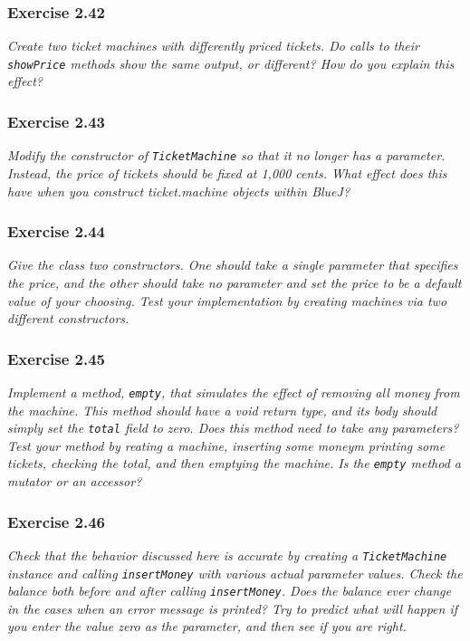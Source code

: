 \subsubsection*{Exercise 2.42}
\textit{Create two ticket machines with differently priced tickets. Do calls 
to their \lstinline?showPrice? methods show the same output, or different? How 
do you explain this effect? }

\subsubsection*{Exercise 2.43}
\textit{Modify the constructor of \lstinline?TicketMachine? so that it no 
longer has a parameter. Instead, the price of tickets should be fixed at 1,000 
cents. What effect does this have when you construct ticket.machine objects 
within BlueJ? }

\subsubsection*{Exercise 2.44}
\textit{Give the class two constructors. One should take a single parameter 
that specifies the price, and the other should take no parameter and set the 
price to be a default value of your choosing. Test your implementation by 
creating machines via two different constructors. }

\subsubsection*{Exercise 2.45}
\textit{Implement a method, \lstinline?empty?, that simulates the effect of 
removing all money from the machine. This method should have a void return 
type, and its body should simply set the \lstinline?total? field to zero. Does 
this method need to take any parameters? Test your method by reating a 
machine, inserting some moneym printing some tickets, checking the total, and 
then emptying the machine. Is the \lstinline?empty? method a mutator or an 
accessor? }

\subsubsection*{Exercise 2.46}
\textit{Check that the behavior discussed here is accurate by creating a 
\lstinline?TicketMachine? instance and calling \lstinline?insertMoney? with 
various actual parameter values. Check the balance both before and after 
calling \lstinline?insertMoney?. Does the balance ever change in the cases 
when an error message is printed? Try to predict what will happen if you enter 
the value zero as the parameter, and then see if you are right. }

